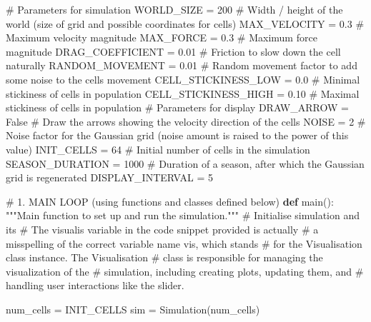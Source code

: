 \documentclass[
  letterpaper,
  DIV=11,
  numbers=noendperiod]{scrreprt}
\newenvironment{Shaded}{\begin{snugshade}}{\end{snugshade}}
\newcommand{\CommentTok}[1]{\textcolor[rgb]{0.37,0.37,0.37}{#1}}
\newcommand{\DecValTok}[1]{\textcolor[rgb]{0.68,0.00,0.00}{#1}}
\newcommand{\FloatTok}[1]{\textcolor[rgb]{0.68,0.00,0.00}{#1}}
\newcommand{\KeywordTok}[1]{\textcolor[rgb]{0.00,0.23,0.31}{\textbf{#1}}}
\newcommand{\NormalTok}[1]{\textcolor[rgb]{0.00,0.23,0.31}{#1}}
\newcommand{\OperatorTok}[1]{\textcolor[rgb]{0.37,0.37,0.37}{#1}}
\newcommand{\VariableTok}[1]{\textcolor[rgb]{0.07,0.07,0.07}{#1}}
\theoremstyle{definition}
\theoremstyle{remark}
\begin{document}
\begin{tcolorbox}
\begin{Shaded}
\begin{Highlighting}[]
\CommentTok{\# Parameters for simulation}
\NormalTok{WORLD\_SIZE }\OperatorTok{=} \DecValTok{200}  \CommentTok{\# Width / height of the world (size of grid and possible coordinates for cells)}
\NormalTok{MAX\_VELOCITY }\OperatorTok{=} \FloatTok{0.3}  \CommentTok{\# Maximum velocity magnitude}
\NormalTok{MAX\_FORCE }\OperatorTok{=} \FloatTok{0.3}  \CommentTok{\# Maximum force magnitude}
\NormalTok{DRAG\_COEFFICIENT }\OperatorTok{=} \FloatTok{0.01}  \CommentTok{\# Friction to slow down the cell naturally}
\NormalTok{RANDOM\_MOVEMENT  }\OperatorTok{=} \FloatTok{0.01} \CommentTok{\# Random movement factor to add some noise to the cell\textquotesingle{}s movement}
\NormalTok{CELL\_STICKINESS\_LOW }\OperatorTok{=} \FloatTok{0.0} \CommentTok{\# Minimal stickiness of cells in population}
\NormalTok{CELL\_STICKINESS\_HIGH }\OperatorTok{=} \FloatTok{0.10} \CommentTok{\# Maximal stickiness of cells in population}
\CommentTok{\# Parameters for display}
\NormalTok{DRAW\_ARROW }\OperatorTok{=} \VariableTok{False}  \CommentTok{\# Draw the arrows showing the velocity direction of the cells}
\NormalTok{NOISE }\OperatorTok{=} \DecValTok{2} \CommentTok{\# Noise factor for the Gaussian grid (noise amount is raised to the power of this value)}
\NormalTok{INIT\_CELLS }\OperatorTok{=} \DecValTok{64} \CommentTok{\# Initial number of cells in the simulation}
\NormalTok{SEASON\_DURATION }\OperatorTok{=} \DecValTok{1000} \CommentTok{\# Duration of a season, after which the Gaussian grid is regenerated}
\NormalTok{DISPLAY\_INTERVAL }\OperatorTok{=} \DecValTok{5}

\CommentTok{\# 1. MAIN LOOP (using functions and classes defined below)}
\KeywordTok{def}\NormalTok{ main():}
    \CommentTok{"""Main function to set up and run the simulation."""}
    \CommentTok{\# Initialise simulation and its \# The \textasciigrave{}visualis\textasciigrave{} variable in the code snippet provided is actually}
    \CommentTok{\# a misspelling of the correct variable name \textasciigrave{}vis\textasciigrave{}, which stands}
    \CommentTok{\# for the \textasciigrave{}Visualisation\textasciigrave{} class instance. The \textasciigrave{}Visualisation\textasciigrave{}}
    \CommentTok{\# class is responsible for managing the visualization of the}
    \CommentTok{\# simulation, including creating plots, updating them, and}
    \CommentTok{\# handling user interactions like the slider.}
    
\NormalTok{    num\_cells }\OperatorTok{=}\NormalTok{ INIT\_CELLS}
\NormalTok{    sim }\OperatorTok{=}\NormalTok{ Simulation(num\_cells) }


\end{Highlighting}
\end{Shaded}
\end{tcolorbox}
\end{document}

